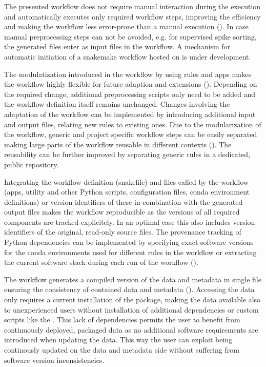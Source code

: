 The presented workflow does not require manual interaction during the execution and automatically executes only required workflow steps, improving the efficiency and making the workflow less error-prone than a manual execution (). In case manual preprocessing steps can not be avoided, e.g. for supervised spike sorting, the generated files enter as input files in the workflow. A mechanism for automatic initiation of a snakemake workflow hosted on  is under development.

The modulatization introduced in the workflow by using  rules and apps makes the workflow highly flexible for future adaption and extensions (). Depending on the required change, additional preprocessing scripts only need to be added and the workflow definition itself remains unchanged. Changes involving the adaptation of the workflow can be implemented by introducing additional input and output files, relating new  rules to existing ones.
Due to the modularization of the workflow, generic and project specific workflow steps can be easily separated making large parts of the workflow reusable in different contexts (). The reusability can be further improved by separating generic rules in a dedicated, public repository.

Integrating the workflow definition (snakefile) and files called by the workflow (apps, utility and other Python scripts, configuration files, conda environment definitions) or version identifiers of these in combination with the generated output files makes the workflow reproducible as the versions of all required components are tracked explicitely. In an optimal case this also includes version identifiers of the original, read-only source files. The provenance tracking of Python dependencies can be implemented by specifying exact software versions for the conda environments used for different rules in the workflow or extracting the current software stack during each run of the workflow ().

The workflow generates a compiled version of the data and metadata in single  file ensuring the consistency of contained data and metadata (). Accessing the data only requires a current installation of the  package, making the data available also to unexperienced users without installation of additional dependencies or custom scripts like the . This lack of dependencies permits the user to benefit from continuously deployed, packaged data as no additional software requirements are introduced when updating the data. This way the user can exploit being continously updated on the data and metadata side without suffering from software version inconsistencies.

